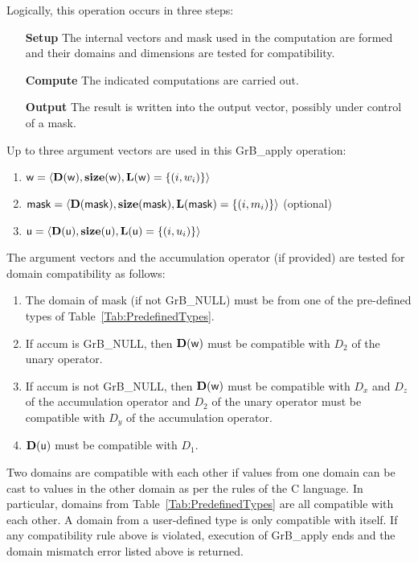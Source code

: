Logically, this operation occurs in three steps:
\begin{enumerate}[leftmargin=0.75in]
\item[\bf Setup] The internal vectors and mask used in the computation are formed 
and their domains and dimensions are tested for compatibility.
\item[\bf Compute] The indicated computations are carried out.
\item[\bf Output] The result is written into the output vector, possibly under 
control of a mask.
\end{enumerate}

Up to three argument vectors are used in this {\sf GrB\_apply} operation:
\begin{enumerate}
	\item ${\sf w} = \langle \bold{D}({\sf w}),\bold{size}({\sf w}),
    \bold{L}({\sf w}) = \{(i,w_i) \} \rangle$

	\item ${\sf mask} = \langle \bold{D}({\sf mask}),\bold{size}({\sf mask}),
    \bold{L}({\sf mask}) = \{(i,m_i) \} \rangle$ (optional)

	\item ${\sf u} = \langle \bold{D}({\sf u}),\bold{size}({\sf u}),
    \bold{L}({\sf u}) = \{(i,u_i) \} \rangle$
\end{enumerate}

The argument vectors and the accumulation 
operator (if provided) are tested for domain compatibility as follows:
\begin{enumerate}
	\item The domain of {\sf mask} (if not {\sf GrB\_NULL}) must be from one of 
    the pre-defined types of Table~\ref{Tab:PredefinedTypes}.

	\item If {\sf accum} is {\sf GrB\_NULL}, then $\bold{D}({\sf w})$ must be 
    compatible with $D_2$ of the unary operator.

	\item If {\sf accum} is not {\sf GrB\_NULL}, then $\bold{D}({\sf w})$ must be
    compatible with $D_x$ and $D_z$ of the accumulation operator and 
    $D_2$ of the unary operator must be compatible with $D_y$ of the accumulation operator.

	\item $\bold{D}({\sf u})$ must be compatible with $D_1$.
\end{enumerate}
Two domains are compatible with each other if values from one domain can be cast 
to values in the other domain as per the rules of the C language.
In particular, domains from Table~\ref{Tab:PredefinedTypes} are all compatible 
with each other. A domain from a user-defined type is only compatible with itself.
If any compatibility rule above is violated, execution of {\sf GrB\_apply} ends
and the domain mismatch error listed above is returned.

